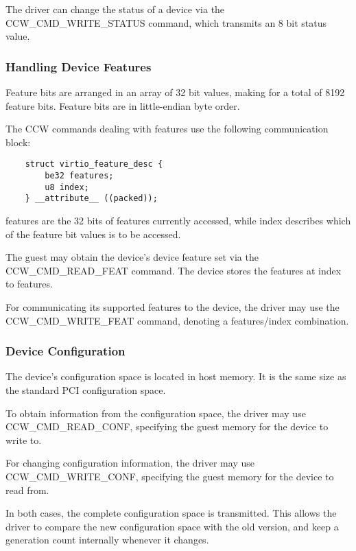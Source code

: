 The driver can change the status of a device via the
CCW_CMD_WRITE_STATUS command, which transmits an 8 bit status
value.

\subsubsection{Handling Device Features}\label{sec:Virtio Transport Options / Virtio over channel I/O / Device Initialization / Handling Device Features}

Feature bits are arranged in an array of 32 bit values, making
for a total of 8192 feature bits. Feature bits are in
little-endian byte order.

The CCW commands dealing with features use the following
communication block:

\begin{lstlisting}
	struct virtio_feature_desc {
		be32 features;
		u8 index;
	} __attribute__ ((packed));
\end{lstlisting}

features are the 32 bits of features currently accessed, while
index describes which of the feature bit values is to be
accessed.

The guest may obtain the device's device feature set via the
CCW_CMD_READ_FEAT command. The device stores the features at index
to features.

For communicating its supported features to the device, the driver may
use the CCW_CMD_WRITE_FEAT command, denoting a features/index
combination.

\subsubsection{Device Configuration}\label{sec:Virtio Transport Options / Virtio over channel I/O / Device Initialization / Device Configuration}

The device's configuration space is located in host memory. It is
the same size as the standard PCI configuration space.

To obtain information from the configuration space, the driver may
use CCW_CMD_READ_CONF, specifying the guest memory for the device
to write to.

For changing configuration information, the driver may use
CCW_CMD_WRITE_CONF, specifying the guest memory for the device to
read from.

In both cases, the complete configuration space is transmitted.  This
allows the driver to compare the new configuration space with the old
version, and keep a generation count internally whenever it changes.

